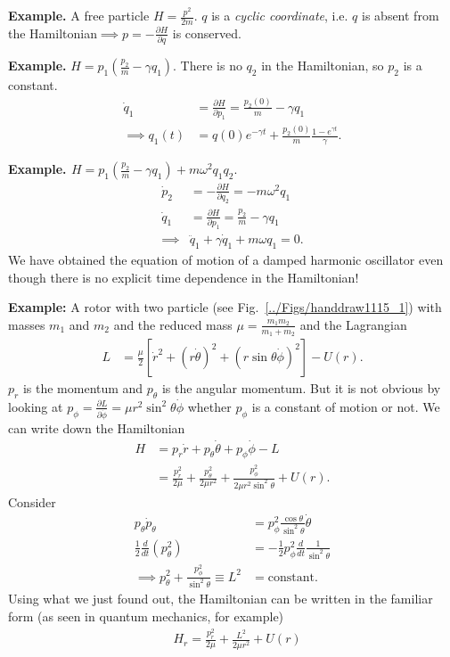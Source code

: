 \textbf{Example. }A free particle $H=\frac{p^{2}}{2m}$. $q$ is a
\emph{cyclic coordinate}, i.e. $q$ is absent from the Hamiltonian$\implies$$p=-\frac{\partial H}{\partial q}$
is conserved. 

\textbf{Example. }$H=p_{1}\left(\frac{p_{2}}{m}-\gamma q_{1}\right)$.
There is no $q_{2}$ in the Hamiltonian, so $p_{2}$ is a constant.
\begin{align}
\dot{q}_{1} & =\frac{\partial H}{\partial p_{1}}=\frac{p_{2}(0)}{m}-\gamma q_{1}\\
\implies q_{1}(t) & =q(0)e^{-\gamma t}+\frac{p_{2}(0)}{m}\frac{1-e^{\gamma t}}{\gamma}.
\end{align}


\textbf{Example. $H=p_{1}\left(\frac{p_{2}}{m}-\gamma q_{1}\right)+m\omega^{2}q_{1}q_{2}$}.
\begin{align}
\dot{p}_{2} & =-\frac{\partial H}{\partial q_{2}}=-m\omega^{2}q_{1}\\
\dot{q}_{1} & =\frac{\partial H}{\partial p_{1}}=\frac{p_{2}}{m}-\gamma q_{1}\\
\implies & \boxed{\ddot{q}_{1}+\gamma\dot{q}_{1}+m\omega q_{1}=0}.
\end{align}
We have obtained the equation of motion of a damped harmonic oscillator
even though there is no explicit time dependence in the Hamiltonian!

\textbf{Example: }A rotor with two particle (see Fig.~\ref{../Figs/handdraw1115_1}) with masses $m_{1}$ and
$m_{2}$ and the reduced mass $\mu=\frac{m_{1}m_{2}}{m_{1}+m_{2}}$
and the Lagrangian
\begin{align}
L & =\frac{\mu}{2}\left[\dot{r}^{2}+\left(r\dot{\theta}\right)^{2}+\left(r\sin\theta\dot{\phi}\right)^{2}\right]-U(r).
\end{align}
$p_{r}$ is the momentum and $p_{\theta}$ is the angular momentum.
But it is not obvious by looking at $p_{\phi}=\frac{\partial L}{\partial\dot{\phi}}=\mu r^{2}\sin^{2}\theta\dot{\phi}$
whether $p_{\phi}$ is a constant of motion or not. We can write down
the Hamiltonian
\begin{align}
H & =p_{r}\dot{r}+p_{\theta}\dot{\theta}+p_{\phi}\dot{\phi}-L\\
 & =\frac{p_{r}^{2}}{2\mu}+\frac{p_{\theta}^{2}}{2\mu r^{2}}+\frac{p_{\phi}^{2}}{2\mu r^{2}\sin^{2}\theta}+U(r).
\end{align}
Consider
\begin{align}
p_{\theta}\dot{p}_{\theta} & =p_{\phi}^{2}\frac{\cos\theta}{\sin^{2}\theta}\dot{\theta}\\
\frac{1}{2}\frac{d}{dt}\left(p_{\theta}^{2}\right) & =-\frac{1}{2}p_{\phi}^{2}\frac{d}{dt}\frac{1}{\sin^{2}\theta}\\
\implies p_{\theta}^{2}+\frac{p_{\phi}^{2}}{\sin^{2}\theta}\equiv L^{2} & =\mbox{constant}.
\end{align}
Using what we just found out, the Hamiltonian can be written in the
familiar form (as seen in quantum mechanics, for example)
\begin{align}
 & \boxed{H_r=\frac{p_{r}^{2}}{2\mu}+\frac{L^{2}}{2\mu r^{2}}+U(r)}
\end{align}




